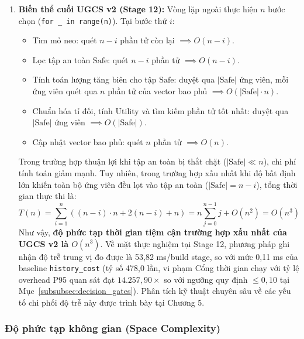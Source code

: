 \begin{enumerate}
    \item \textbf{Biến thể cuối UGCS v2 (Stage 12):}
    Vòng lặp ngoài thực hiện $n$ bước chọn (\texttt{for \_ in range(n)}). Tại bước thứ $i$:
    \begin{itemize}
        \item Tìm mỏ neo: quét $n - i$ phần tử còn lại $\implies O(n - i)$.
        \item Lọc tập an toàn $\text{Safe}$: quét $n - i$ phần tử $\implies O(n - i)$.
        \item Tính toán lượng tăng biên cho tập $\text{Safe}$: duyệt qua $|\text{Safe}|$ ứng viên, mỗi ứng viên quét qua $n$ phần tử của vector bao phủ $\implies O(|\text{Safe}| \cdot n)$.
        \item Chuẩn hóa tỉ đối, tính Utility và tìm kiếm phần tử tốt nhất: duyệt qua $|\text{Safe}|$ ứng viên $\implies O(|\text{Safe}|)$.
        \item Cập nhật vector bao phủ: quét $n$ phần tử $\implies O(n)$.
    \end{itemize}
    Trong trường hợp thuận lợi khi tập an toàn bị thắt chặt ($|\text{Safe}| \ll n$), chi phí tính toán giảm mạnh. Tuy nhiên, trong trường hợp xấu nhất khi độ bất định lớn khiến toàn bộ ứng viên đều lọt vào tập an toàn ($|\text{Safe}| = n - i$), tổng thời gian thực thi là:
    \begin{equation}
    T(n) = \sum_{i=1}^n \left( (n - i) \cdot n + 2(n - i) + n \right) = n \sum_{j=0}^{n-1} j + O(n^2) = O(n^3)
    \end{equation}
    Như vậy, \textbf{độ phức tạp thời gian tiệm cận trường hợp xấu nhất của UGCS v2 là $O(n^3)$}. Về mặt thực nghiệm tại Stage 12, phương pháp ghi nhận độ trễ trung vị đo được là 53,82 ms/build stage, so với mức 0,11 ms của baseline \texttt{history\_cost} (tỷ số 478,0 lần, vi phạm Cổng thời gian chạy với tỷ lệ overhead P95 quan sát đạt $14.257{,}90\times$ so với ngưỡng quy định $\le 0{,}10$ tại Mục~\ref{subsubsec:decision_gates}). Phân tích kỹ thuật chuyên sâu về các yếu tố chi phối độ trễ này được trình bày tại Chương 5.
\end{enumerate}

\subsubsection{Độ phức tạp không gian (Space Complexity)}
\label{subsubsec:space_complexity}

